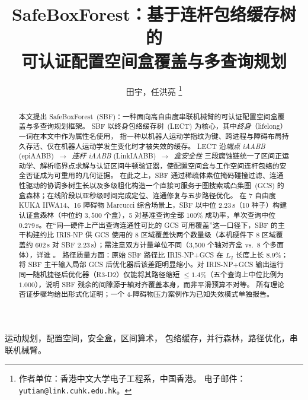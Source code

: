\documentclass[journal]{IEEEtran}
\begin{document}
\title{SafeBoxForest：基于连杆包络缓存树的\\
可认证配置空间盒覆盖与多查询规划}

\author{田宇，任洪亮%
\thanks{作者单位：香港中文大学电子工程系，中国香港。
电子邮件：\texttt{yutian@link.cuhk.edu.hk}。}}

\maketitle

\begin{abstract}
本文提出 SafeBoxForest~(SBF)：一种面向高自由度串联机械臂的可认证配置空间盒覆盖与多查询规划框架。
SBF 以终身包络缓存树~(LECT) 为核心，其中\emph{终身}（lifelong）一词在本文中作为属性名使用，
指一种以机器人运动学指纹为键、跨进程与障碍布局持久存活、仅在机器人运动学发生变化时才被失效的缓存。
LECT 沿\emph{端点 iAABB} (epiAABB)~$\to$~\emph{连杆 iAABB} (LinkIAABB)~$\to$~\emph{盒安全性} 三段腐蚀链统一了区间正运动学、解析临界点求解与认证区间牛顿验证器，使配置空间盒与工作空间连杆包络的安全否证成为可重用的几何证据。
在此之上，SBF 通过稀疏体素位掩码碰撞过滤、连通性驱动的协调多树生长以及多级粗化构造一个直接可服务于图搜索或凸集图~(GCS) 的盒森林；在线阶段以亚秒级时间完成定位、连通修复与五步路径优化。
在 7 自由度 KUKA IIWA14、16 障碍物 Marcucci 综合场景上，SBF 以中位 $2.23$\,s（10 种子）构建认证盒森林（中位约 $3{,}500$ 个盒），5 对基准查询全部 $100\%$ 成功率，单次查询中位 $0.279$\,s。在“同一硬件上产出查询连通性可比的 GCS 可用覆盖”这一口径下，SBF 的主干构建约比 IRIS-NP 供 GCS 使用的 8 区域覆盖快两个数量级（本机硬件下 8 区域覆盖约 $602$\,s 对 SBF $2.23$\,s）；需注意双方计量单位不同（3{,}500 个轴对齐盒 vs.\ 8 个多面体），详谁 。
路径质量方面：原始 SBF 路径比 IRIS-NP+GCS 在 $L_2$ 长度上长 $8.9\%$；将 SBF 主干输入局部 GCS 后优化器后该差距明显缩小。对 IRIS-NP+GCS 输出运行同一随机捷径后优化器（R3-D2）仅能将其路径缩短 $\le 1.4\%$（五个查询上中位比例为 $1.000$），说明 SBF 残余的间隙源于轴对齐覆盖本身，而非平滑预算不对等。
所有理论否证步骤均给出形式化证明；一个 4-障碍物压力案例作为已知失效模式单独报告。
\end{abstract}

\begin{IEEEkeywords}
运动规划，配置空间，安全盒，区间算术，
包络缓存，并行森林，路径优化，串联机械臂。
\end{IEEEkeywords}

\end{document}
